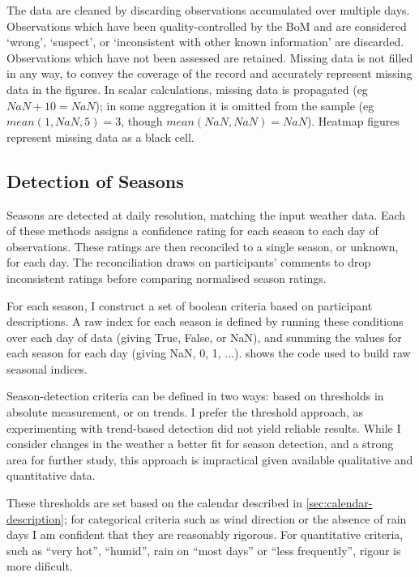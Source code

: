The data are cleaned by discarding observations accumulated over multiple days.
Observations which have been quality-controlled by the BoM and are considered
`wrong', `suspect', or `inconsistent with other known information' are discarded.
Observations which have not been assessed are retained.
%
Missing data is not filled in any way, to convey the coverage of the record
and accurately represent missing data in the figures.  In scalar calculations,
missing data is propagated (eg ${NaN+10=NaN}$); in some aggregation
it is omitted from the sample (eg ${mean(1,NaN,5)=3}$, though
${mean(NaN,NaN)=NaN}$). Heatmap figures represent missing data as a black cell.


\subsection{Detection of Seasons}
\label{meth:seas-detection}

Seasons are detected at daily resolution, matching the input weather data.
Each of these methods assigns a confidence rating for each season to each day of
observations.  These ratings are then reconciled to a single season, or unknown,
for each day.  The reconciliation draws on participants' comments to drop inconsistent
ratings before comparing normalised season ratings.

For each season, I construct a set of boolean criteria based on participant
descriptions.  A raw index for each season is defined by
running these conditions over each day of data (giving True, False, or NaN),
and summing the values for each season for each day (giving NaN, 0, 1, ...).
 shows the code used to build raw
seasonal indices.

Season-detection criteria can be defined in two ways: based on thresholds
in absolute measurement, or on trends.  I prefer the threshold approach,
as experimenting with trend-based detection did not yield reliable results.
While I consider changes in the weather a better fit for season detection,
and a strong area for further study, this approach is impractical given available
qualitative and quantitative data.

These thresholds are set based on the calendar described in \cref{sec:calendar-description};
for categorical criteria such as wind direction or the absence of rain days
I am confident that they are reasonably rigorous.  For quantitative criteria,
such as ``very hot'', ``humid'', rain on ``most days'' or ``less frequently'',
rigour is more dificult.

